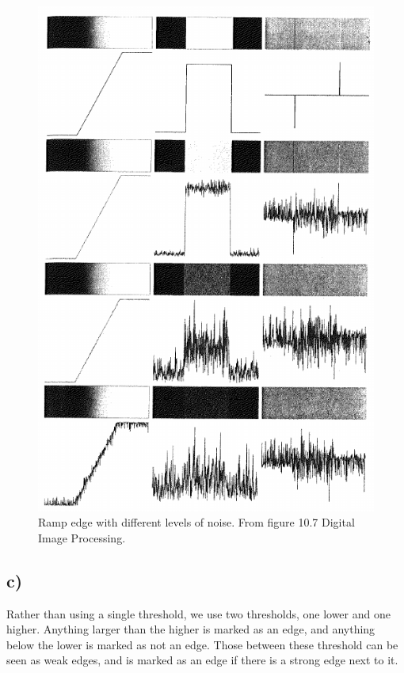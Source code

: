 \begin{figure}[]
    \centering
    \includegraphics[width=1.00\textwidth]{figures/noisy_edge.png}
    \caption{Ramp edge with different levels of noise. From figure 10.7 Digital Image Processing. }
    \label{fig:noisy_edge}
\end{figure}

\subsection*{c)}
Rather than using a single threshold, we use two thresholds, one lower and one higher. Anything larger than the higher is marked as an edge, and anything below the lower is marked as not an edge. Those between these threshold can be seen as weak edges, and is marked as an edge if there is a strong edge next to it. 

